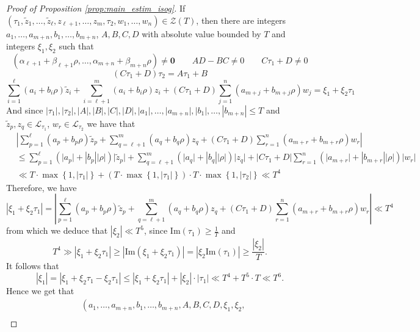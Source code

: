 \documentclass[11pt,a4paper,reqno]{amsart}
\numberwithin{equation}{section}
\renewcommand{\a}{\alpha}
\renewcommand{\b}{\beta}
\renewcommand{\r}{\rho}
\newcommand{\pt}[1]{\left( #1 \right)}
\newcommand{\pg}[1]{\left\lbrace #1 \right\rbrace}
\newcommand{\abs}[1]{\left| #1 \right|}
\renewcommand{\Im}{\mathrm{Im}}
\theoremstyle{remark}
\theoremstyle{definition}
\theoremstyle{definition}
\begin{document}
\begin{proof}[Proof of Proposition \ref{prop:main_estim_isog}]
If $(\tau_1,\widetilde{z}_1,\ldots,\widetilde{z}_{\ell}, z_{\ell+1}, \ldots, z_m, \tau_2, w_1, \ldots, w_n) \in \mathcal{Z}(T)$, then there are integers $ a_1, \ldots, a_{m+n},b_1, \ldots, b_{m+n}$, $A,B,C,D $ with absolute value bounded by $T$ and integers $\xi_1, \xi_2$ such that 
\[ \pt{\a_{\ell+1}+\b_{\ell+1} \r, \ldots,\a_{m+n}+ \b_{m+n} \r}\neq \mathbf{0} \qquad AD - BC \neq 0  \qquad C\tau_1 + D \neq 0 \]
\[ \pt{C\tau_1+D}\tau_2=A\tau_1+B \]
\[ \sum\limits_{i=1}^{\ell}(a_i+b_i \r)\widetilde{z}_i + \sum\limits_{i=\ell+1}^{m}(a_i+b_i \r)z_i+\pt{C\tau_1+D}\sum\limits_{j=1}^{n}(a_{m+j}+b_{m+j}\r)w_j=\xi_1+\xi_2 \tau_1\]
And since $ \lvert \tau_1 \rvert, \lvert \tau_2 \rvert, \lvert A \rvert, \lvert B \rvert, \lvert C \rvert, \lvert D \rvert, \lvert a_{1} \rvert, \ldots,  \lvert a_{m+n} \rvert, \abs{b_{1}}, \ldots, \abs{b_{m+n}}\leq T$ and $\widetilde{z}_p, z_{q} \in \mathcal{L}_{\tau_1}$, $w_r \in \mathcal{L}_{\tau_2}$ we have that
\begin{align*}
&\left| \sum\limits_{p=1}^{\ell}(a_p+b_p \r)\widetilde{z}_p + \sum\limits_{q=\ell+1}^{m} (a_q +b_q \r)z_q + (C\tau_1+D)\sum\limits_{r=1}^{n} (a_{m+r}+b_{m+r}\r) w_r \right|\\
 &\leq \sum\limits_{p=1}^{\ell} \pt{\lvert a_p \rvert+ \abs{b_p} \abs{\r}}  \lvert \widetilde{z}_p \rvert + \sum\limits_{q=\ell+1}^{m} \pt{\lvert a_q \rvert+ \abs{b_q} \abs{\r}}  \lvert z_q \rvert + \lvert C\tau_1+D \rvert \sum\limits_{r=1}^{n} \pt{\lvert a_{m+r} \rvert +\abs{b_{m+r}}\abs{\r}} \lvert w_r \rvert \\
&\ll T \cdot \max \pg{1, \lvert \tau_1 \rvert}+ (T\cdot \max\pg{1, \abs{\tau_1}}) \cdot T \cdot \max \pg{1, \lvert \tau_2 \rvert} \ll T^4
\end{align*}
Therefore, we have 
$$\abs{\xi_1+ \xi_2\tau_1}=\abs{\sum\limits_{p=1}^{\ell}(a_p+b_p \r)\widetilde{z}_p + \sum\limits_{q=\ell+1}^{m} (a_q +b_q \r)z_q + (C\tau_1+D)\sum\limits_{r=1}^{n} (a_{m+r}+b_{m+r}\r) w_r}\ll T^4$$
from which we deduce that $\abs{\xi_2}\ll T^5$, since $\Im(\tau_1)\geq \frac{1}{T}$ and
$$T^4 \gg \abs{\xi_1+ \xi_2\tau_1} \geq \abs{\Im(\xi_1+ \xi_2\tau_1)}=\abs{\xi_2 \Im(\tau_1)}\geq \frac{\abs{\xi_2}}{T}.$$
It follows that $$\abs{\xi_1}=\abs{\xi_1+\xi_2\tau_1-\xi_2\tau_1}\leq \abs{\xi_1+\xi_2\tau_1}+\abs{\xi_2}\cdot \abs{\tau_1} \ll T^4+ T^5 \cdot T \ll T^6.$$
Hence we get that 
\begin{align*}
& \left( a_1, \ldots, a_{m+n},b_1, \ldots, b_{m+n}, A,B,C,D, \xi_1, \xi_2,\right. \\

\end{align*}
\end{proof}
\end{document}
